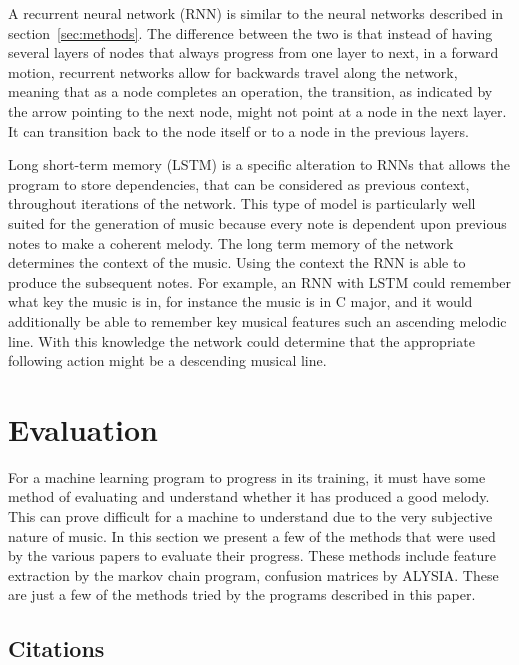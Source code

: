 \documentclass{sig-alternate}
\begin{document}
	 A recurrent neural network (RNN) is similar to the neural networks described in section~\ref{sec:methods}. The difference between the two is that instead of having several layers of nodes that always progress from one layer to next, in a forward motion, recurrent networks allow for backwards travel along the network, meaning that as a node completes an operation, the transition, as indicated by the arrow pointing to the next node, might not point at a node in the next layer. It can transition back to the node itself or to a node in the previous layers.
	
	Long short-term memory (LSTM) is a specific alteration to RNNs that allows the program to store dependencies, that can be considered as previous context, throughout iterations of the network. This type of model is particularly well suited for the generation of music because every note is dependent upon previous notes to make a coherent melody. The long term memory of the network determines the context of the music. Using the context the RNN is able to produce the subsequent notes. For example, an RNN with LSTM could remember what key the music is in, for instance the music is in C major, and it would additionally be able to remember key musical features such an ascending melodic line. With this knowledge the network could determine that the appropriate following action might be a descending musical line.


\section{Evaluation}
\label{sec:evaluation}

For a machine learning program to progress in its training, it must have some method of evaluating and understand whether it has produced a good melody. This can prove difficult for a machine to understand due to the very subjective nature of music. In this section we present a few of the methods that were used by the various papers to evaluate their progress. These methods include feature extraction by the markov chain program, confusion matrices by ALYSIA. These are just a few of the methods tried by the programs described in this paper.

	
	


\subsection{Citations}
\label{sec:citations}
\end{document}
